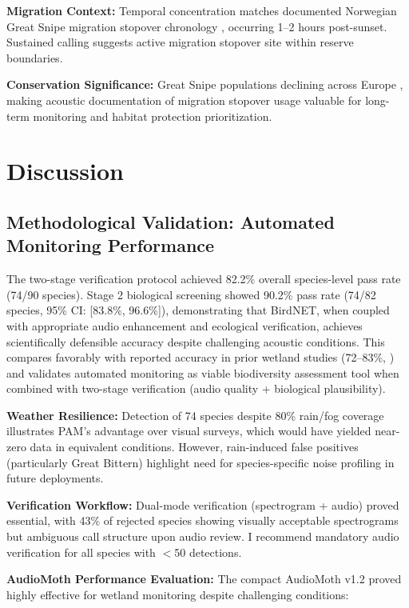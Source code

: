\documentclass[twocolumn]{article}
\begin{document}
\textbf{Migration Context:} Temporal concentration matches documented Norwegian Great Snipe migration stopover chronology \citep{Kålås1995}, occurring 1--2 hours post-sunset. Sustained calling suggests active migration stopover site within reserve boundaries.

\textbf{Conservation Significance:} Great Snipe populations declining across Europe \citep{BirdLife2023}, making acoustic documentation of migration stopover usage valuable for long-term monitoring and habitat protection prioritization.

\section{Discussion}

\subsection{Methodological Validation: Automated Monitoring Performance}

The two-stage verification protocol achieved 82.2\% overall species-level pass rate (74/90 species). Stage 2 biological screening showed 90.2\% pass rate (74/82 species, 95\% CI: [83.8\%, 96.6\%]), demonstrating that BirdNET, when coupled with appropriate audio enhancement and ecological verification, achieves scientifically defensible accuracy despite challenging acoustic conditions. This compares favorably with reported accuracy in prior wetland studies (72--83\%, \citet{Wood2022}) and validates automated monitoring as viable biodiversity assessment tool when combined with two-stage verification (audio quality + biological plausibility).

\textbf{Weather Resilience:} Detection of 74 species despite 80\% rain/fog coverage illustrates PAM's advantage over visual surveys, which would have yielded near-zero data in equivalent conditions. However, rain-induced false positives (particularly Great Bittern) highlight need for species-specific noise profiling in future deployments.

\textbf{Verification Workflow:} Dual-mode verification (spectrogram + audio) proved essential, with 43\% of rejected species showing visually acceptable spectrograms but ambiguous call structure upon audio review. I recommend mandatory audio verification for all species with $<$50 detections.

\textbf{AudioMoth Performance Evaluation:} The compact AudioMoth v1.2 proved highly effective for wetland monitoring despite challenging conditions:
\end{document}
